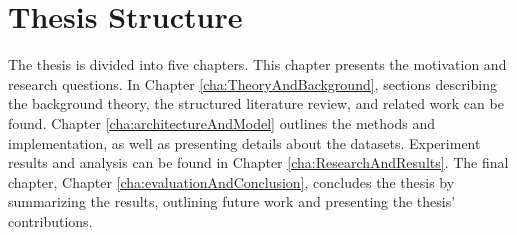 \section{Thesis Structure}
\label{sec:thesisStructure}
The thesis is divided into five chapters. This chapter presents the motivation and research questions. In Chapter \ref{cha:TheoryAndBackground}, sections describing the background theory, the structured literature review, and related work can be found. Chapter \ref{cha:architectureAndModel} outlines the methods and implementation, as well as presenting details about the datasets. Experiment results and analysis can be found in Chapter \ref{cha:ResearchAndResults}. The final chapter, Chapter \ref{cha:evaluationAndConclusion}, concludes the thesis by summarizing the results, outlining future work and presenting the thesis' contributions.